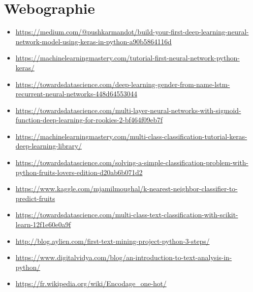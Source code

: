 \documentclass[11pt]{article}
\begin{document}
\section{Webographie} 
\begin{itemize}
\item \url{https://medium.com/@pushkarmandot/build-your-first-deep-learning-neural-network-model-using-keras-in-python-a90b5864116d} \newline
\item \url{https://machinelearningmastery.com/tutorial-first-neural-network-python-keras/} \newline
\item \url{https://towardsdatascience.com/deep-learning-gender-from-name-lstm-recurrent-neural-networks-448d64553044} \newline
\item \url{https://towardsdatascience.com/multi-layer-neural-networks-with-sigmoid-function-deep-learning-for-rookies-2-bf464f09eb7f} \newline
\item \url{https://machinelearningmastery.com/multi-class-classification-tutorial-keras-deep-learning-library/} \newline
\item \url{https://towardsdatascience.com/solving-a-simple-classification-problem-with-python-fruits-lovers-edition-d20ab6b071d2} \newline
\item \url{https://www.kaggle.com/mjamilmoughal/k-nearest-neighbor-classifier-to-predict-fruits} \newline
\item \url{https://towardsdatascience.com/multi-class-text-classification-with-scikit-learn-12f1e60e0a9f} \newline
\item \url{http://blog.aylien.com/first-text-mining-project-python-3-steps/} \newline
\item \url{https://www.digitalvidya.com/blog/an-introduction-to-text-analysis-in-python/} \newline
\item \url{https://fr.wikipedia.org/wiki/Encodage_one-hot/} \newline

\end{itemize}
\end{document}
